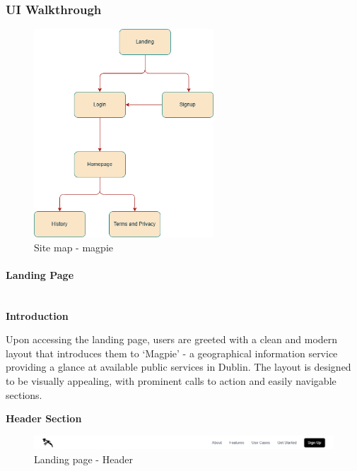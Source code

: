 \subsubsection{UI Walkthrough}
\begin{figure}[htbp]
    \centering{}
    \includegraphics[width=0.6\textwidth]{images/site/sitemap.png}
    \caption{Site map {-} magpie}
\end{figure}

\paragraph{Landing Page}\mbox{}\\
\textbf{Introduction}

Upon accessing the landing page, users are greeted with a clean and modern
layout that introduces them to `Magpie' {-} a geographical information service
providing a glance at available public services in Dublin. The layout is
designed to be visually appealing, with prominent calls to action and easily
navigable sections.

\newpage{}

\textbf{Header Section}

\begin{figure}[htbp]
    \centering{}
    \includegraphics[width=1\textwidth]{images/site/landing/landing_6_header.png}
    \caption{Landing page {-} Header}
\end{figure}

